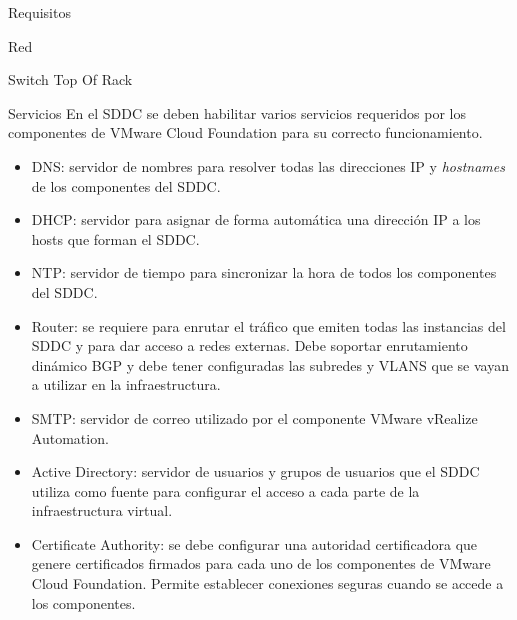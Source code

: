 \begin{section}{Requisitos}
\begin{subsection}{Red}
\begin{subsubsection}{Switch Top Of Rack}
 \end{subsubsection}
 \begin{subsubsection}{Servicios}
     En el SDDC se deben habilitar varios servicios requeridos por los componentes de VMware Cloud Foundation para su correcto funcionamiento.
     \begin{itemize}
         \item DNS: servidor de nombres para resolver todas las direcciones IP y \textit{hostnames} de los componentes del SDDC.
         \item DHCP: servidor para asignar de forma automática una dirección IP a los hosts que forman el SDDC.
         \item NTP: servidor de tiempo para sincronizar la hora de todos los componentes del SDDC.
         \item Router: se requiere para enrutar el tráfico que emiten todas las instancias del SDDC y para dar acceso a redes externas. Debe soportar enrutamiento dinámico BGP y debe tener configuradas las subredes y VLANS que se vayan a utilizar en la infraestructura.
         \item SMTP: servidor de correo utilizado por el componente VMware vRealize Automation.
         \item Active Directory: servidor de usuarios y grupos de usuarios que el SDDC utiliza como fuente para configurar el acceso a cada parte de la infraestructura virtual.
         \item Certificate Authority: se debe configurar una autoridad certificadora que genere certificados firmados para cada uno de los componentes de VMware Cloud Foundation. Permite establecer conexiones seguras cuando se accede a los componentes.
     \end{itemize}
 \end{subsubsection}
\end{subsection}


\end{section}



